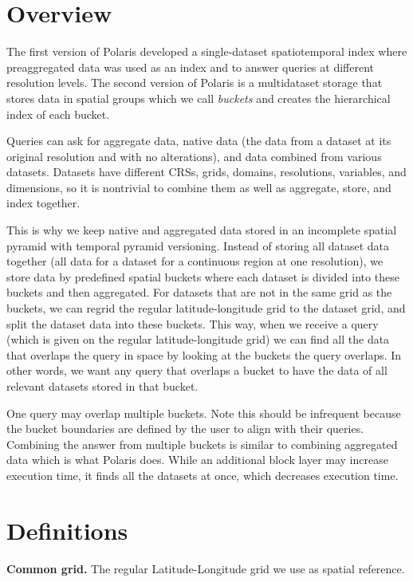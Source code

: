 

\section{Overview}
The first version of Polaris developed a single-dataset spatiotemporal index where preaggregated data was used as an index and to answer queries at different resolution levels. The second version of Polaris is a multidataset storage that stores data in spatial groups which we call \emph{buckets} and creates the hierarchical index of each bucket.

Queries can ask for aggregate data, native data (the data from a dataset at its original resolution and with no alterations), and data combined from various datasets. Datasets have different CRSs, grids, domains, resolutions, variables, and dimensions, so it is nontrivial to combine them as well as aggregate, store, and index together. 

This is why we keep native and aggregated data stored in an incomplete spatial pyramid with temporal pyramid versioning. Instead of storing all dataset data together (all data for a dataset for a continuous region at one resolution), we store data by predefined spatial buckets where each dataset is divided into these buckets and then aggregated. For datasets that are not in the same grid as the buckets, we can regrid the regular latitude-longitude grid to the dataset grid, and split the dataset data into these buckets. This way, when we receive a query (which is given on the regular latitude-longitude grid) we can find all the data that overlaps the query in space by looking at the buckets the query overlaps. In other words, we want any query that overlaps a bucket to have the data of all relevant datasets stored in that bucket.

One query may overlap multiple buckets. Note this should be infrequent because the bucket boundaries are defined by the user to align with their queries. Combining the answer from multiple buckets is similar to combining aggregated data which is what Polaris does. While an additional block layer may increase execution time, it finds all the datasets at once, which decreases execution time. 


\section{Definitions}
\textbf{Common grid.} The regular Latitude-Longitude grid we use as spatial reference.

